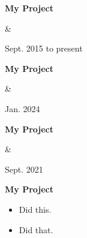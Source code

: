 \documentclass[10pt, letterpaper]{article}
\newenvironment{highlights}{
        \begin{itemize}[
                topsep=0pt,
                parsep=0.10 cm,
                partopsep=0pt,
                itemsep=0pt,
                after=\vspace{-1\baselineskip},
                leftmargin=0.4 cm + 3pt
            ]
    }{
        \end{itemize}
    } %
\let\originalTabularx\tabularx
\let\originalEndTabularx\endtabularx
\renewenvironment{tabularx}{\bgroup\centering\originalTabularx}{\originalEndTabularx\par\egroup}
\begin{document}
        \vspace{0.2 cm}
        \begin{tabularx}{
            \textwidth-0.4 cm-0.13cm
        }{
            K{0.2 cm}
            R{4.1 cm}
        }
            \textbf{My Project}

            \vspace{0.10 cm}

            &
            

            Sept. 2015 to present
        \end{tabularx}


        \vspace{0.2 cm}
        \begin{tabularx}{
            \textwidth-0.4 cm-0.13cm
        }{
            K{0.2 cm}
            R{4.1 cm}
        }
            \textbf{My Project}

            \vspace{0.10 cm}

            &
            

            Jan. 2024
        \end{tabularx}


        \vspace{0.2 cm}
        \begin{tabularx}{
            \textwidth-0.4 cm-0.13cm
        }{
            K{0.2 cm}
            R{4.1 cm}
        }
            \textbf{My Project}

            \vspace{0.10 cm}

            &
            

            Sept. 2021
        \end{tabularx}


        \vspace{0.2 cm}
        \begin{tabularx}{
            \textwidth-0.4 cm-0.13cm
        }{
            K{0.2 cm}
        }
            \textbf{My Project}

            \vspace{0.10 cm}

            \begin{highlights}
                \item Did this.
                \item Did that.
            \end{highlights}
        \end{tabularx}
\end{document}
